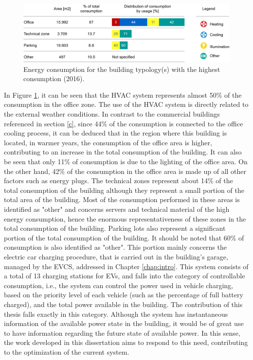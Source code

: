 \begin{figure}[h!]
    \centering
    \begin{center}
    \includegraphics[width=1\textwidth]{Images/ConsumoEDP.png}
    \caption{Energy consumption for the building typology(s) with the highest consumption (2016).}
    \label{consedp}
    \end{center}
\end{figure}
In Figure \ref{consedp}, it can be seen that the \ac{HVAC} system represents almost 50\% of the consumption in the office zone. The use of the \ac{HVAC} system is directly related to the external weather conditions. In contrast to the commercial buildings referenced in section \ref{c}, since 44\% of the consumption is connected to the office cooling process, it can be deduced that in the region where this building is located, in warmer years, the consumption of the office area is higher, contributing to an increase in the total consumption of the building. It can also be seen that only 11\% of consumption is due to the lighting of the office area. On the other hand, 42\% of the consumption in the office area is made up of all other factors such as energy plugs. The technical zones represent about 14\% of the total consumption of the building although they represent a small portion of the total area of the building. Most of the consumption performed in these areas is identified as "other" and concerns servers and technical material of the high energy consumption, hence the enormous representativeness of these zones in the total consumption of the building. Parking lots also represent a significant portion of the total consumption of the building. It should be noted that 60\% of consumption is also identified as "other". This portion mainly concerns the electric car charging procedure, that is carried out in the building's garage, managed by the \ac{EVCS}, addressed in Chapter \ref{chap:intro}. This system consists of a total of 13 charging stations for \ac{EV}s, and falls into the category of controllable consumption, i.e., the system can control the power used in vehicle charging, based on the priority level of each vehicle (such as the percentage of full battery charged), and the total power available in the building. The contribution of this thesis falls exactly in this category. Although the system has instantaneous information of the available power state in the building, it would be of great use to have information regarding the future state of available power. In this sense, the work developed in this dissertation aims to respond to this need, contributing to the optimization of the current system.

